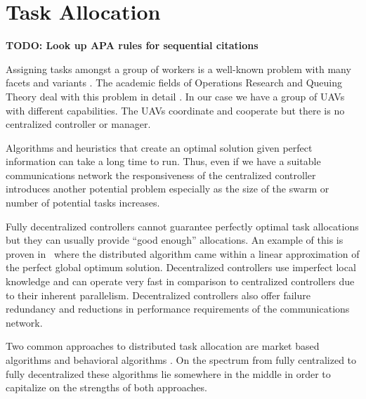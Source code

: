 \section{Task Allocation}
\label{sec:uncoordTaskingRelated}
\textbf{TODO: Look up APA rules for sequential citations}

Assigning tasks amongst a group of workers is a well-known problem with many facets and variants \parencite{hungarian_method} \parencite{hungarian_tribute} \parencite{gen_asgn_prob1} \parencite{gen_asgn_prob2}. The academic fields of Operations Research and Queuing Theory deal with this problem in detail \parencite{queue_theory_book}.  In our case we have a group of UAVs with different capabilities.  The UAVs coordinate and cooperate but there is no centralized controller or manager.   


Algorithms and heuristics that create an optimal solution given perfect information can take a long time to run.  Thus, even if we have a suitable communications network the responsiveness of the centralized controller introduces another potential problem especially as the size of the swarm or number of potential tasks increases. \parencite{heuristic_performance}

Fully decentralized controllers cannot guarantee perfectly optimal task allocations but they can usually provide ``good enough'' allocations.  An example of this is proven in~\textcite{auction_linear_approx} where the distributed algorithm came within a linear approximation of the perfect global optimum solution.  Decentralized controllers use imperfect local knowledge and can operate very fast in comparison to centralized controllers due to their inherent parallelism.  Decentralized controllers also offer failure redundancy and reductions in performance requirements of the communications network.

Two common approaches to distributed task allocation are market based algorithms and behavioral algorithms \parencite{task_alloc_survey}.  On the spectrum from fully centralized to fully decentralized these algorithms lie somewhere in the middle in order to capitalize on the strengths of both approaches.

